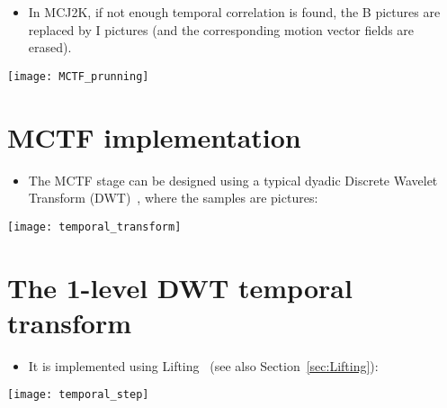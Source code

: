\newpage
\begin{itemize}
\item In MCJ2K, if not enough temporal correlation is found, the B
  pictures are replaced by I pictures (and the corresponding motion
  vector fields are erased).
\end{itemize}
\begin{center}
  \texttt{[image: MCTF\_prunning]}
\end{center}

\section{MCTF implementation}
\begin{itemize}
\item The MCTF stage can be designed using a typical dyadic Discrete
  Wavelet Transform (DWT)~\cite{1989.mallat}, where the samples are
  pictures:
\end{itemize}

\begin{center}
  \texttt{[image: temporal\_transform]}
\end{center}

\section{The 1-level DWT temporal transform}
\begin{itemize}
\item It is implemented using Lifting~\cite{1998.a.daubechies, 1995.sweldens,
    Sweldens.BuildingWavelets} (see also Section~\ref{sec:Lifting}):
\end{itemize}

\begin{center}
  \texttt{[image: temporal\_step]}
\end{center}

